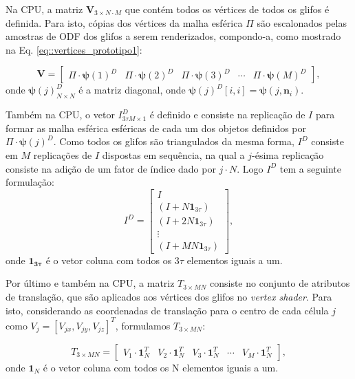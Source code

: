 \documentclass[
    12pt,                %
    oneside,            %
    a4paper,            %
    english,            %
    french,                %
    spanish,            %
    brazil                %
    ]{abntex2}
\begin{document}
Na CPU, a matriz $\mathbf{V}_{3\times N\cdot M}$ que contém todos os vértices de todos os glifos é definida. Para isto, cópias dos vértices da malha esférica $\Pi$ são escalonados pelas amostras de ODF dos glifos a serem renderizados, compondo-a, como mostrado na Eq. \ref{eq::vertices_prototipo1}:

\begin{equation}
\label{eq::vertices_prototipo1}
    \mathbf{V} = 
    \begin{bmatrix}
    \Pi\cdot\boldsymbol{\psi}(1)^D &
    \Pi\cdot\boldsymbol{\psi}(2)^D &
    \Pi\cdot\boldsymbol{\psi}(3)^D & \cdots &
    \Pi\cdot\boldsymbol{\psi}(M)^D
    \end{bmatrix}
    ,
\end{equation}
onde $\boldsymbol{\psi}(j)_{N\times N}^D$ é a matriz diagonal, onde $\boldsymbol{\psi}(j)^D[i, i] = \boldsymbol{\psi}(j, \mathbf{n}_i)$.%

Também na CPU, o vetor $I_{3 \tau M \times 1}^D$ é definido e consiste na replicação de $I$ para formar as malha esférica esféricas de cada um dos objetos definidos por $\Pi\cdot\boldsymbol{\psi}(j)^D$. Como todos os glifos são triangulados da mesma forma, $I^D$ consiste em $M$ replicações de $I$ dispostas em sequência, na qual a $j$-ésima replicação consiste na adição de um fator de índice dado por $j\cdot N$. Logo $I^D$ tem a seguinte formulação:
\begin{equation}
\label{eq::index_prototipo1}
    I^D = 
    \begin{bmatrix}
    I \\
    (I +  N\mathbf{1}_{3\tau}  ) \\
    (I + 2N\mathbf{1}_{3\tau} ) \\ \vdots \\ 
    (I + MN\mathbf{1}_{3\tau})
    \end{bmatrix}
    ,
\end{equation}
onde $\mathbf{1_{3\tau}}$ é o vetor coluna com todos os $3\tau$ elementos iguais a um.

Por último e também na CPU, a matriz $T_{3 \times MN}$ consiste no conjunto de atributos de translação, que são aplicados aos vértices dos glifos no \textit{vertex shader}. Para isto, considerando as coordenadas de translação para o centro de cada célula $j$ como $V_j = [V_{jx}, V_{jy}, V_{jz}]^T$, formulamos $T_{3 \times MN}$:

\begin{equation}
\label{eq::translation_prototipo1}
    T_{3 \times MN} =
    \begin{bmatrix}
    V_1 \cdot \mathbf{1}_N^T &
    V_2 \cdot \mathbf{1}_N^T &
    V_3 \cdot \mathbf{1}_N^T & \cdots &
    V_M \cdot \mathbf{1}_N^T
    \end{bmatrix}
,
\end{equation}
onde $\mathbf{1}_N$ é o vetor coluna com todos os N elementos iguais a um.
\end{document}
